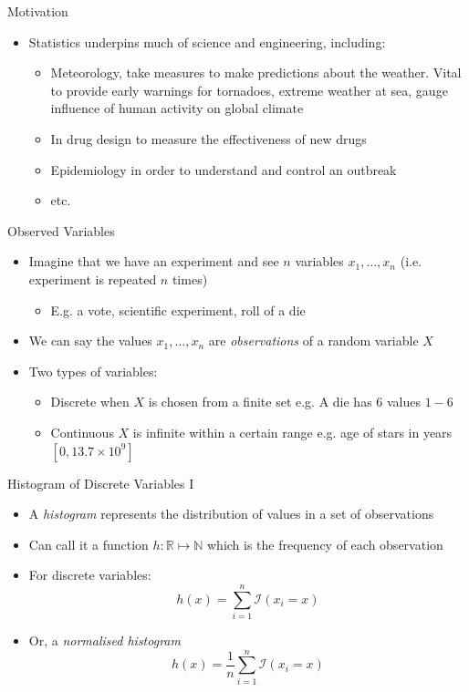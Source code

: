 \documentclass{beamer}
\begin{document}
\begin{frame}{Motivation} 
\begin{itemize} 
 \item Statistics underpins much of science and engineering, including: 
\begin{itemize} 
\item Meteorology, take measures to make predictions about the weather. Vital to provide early warnings for tornadoes, extreme weather at sea, gauge influence of human activity on global climate 
\item In drug design to measure the effectiveness of new drugs 
\item Epidemiology in order to understand and control an outbreak 
\item etc. 
\end{itemize} 
\end{itemize}
\end{frame}

\begin{frame}{Observed Variables}
\begin{itemize} 
 \item Imagine that we have an experiment and see $n$ variables $x_1, \ldots, x_n$ (i.e. experiment is repeated $n$ times)
\begin{itemize} 
\item E.g. a vote, scientific experiment, roll of a die
\end{itemize}
\item We can say the values $x_1, \ldots, x_n$ are \emph{observations} of a random variable $X$ 
\item Two types of variables: 
\begin{itemize} 
 \item Discrete when $X$ is chosen from a finite set e.g. A die has 6 values $1-6$ 
\item Continuous $X$ is infinite within a certain range e.g. age of stars in years $[0, 13.7 \times 10^9]$
\end{itemize}
\end{itemize}
\end{frame}

\begin{frame}{Histogram of Discrete Variables I} 
\begin{itemize} 
 \item A \emph{histogram} represents the distribution of values in a set of observations
\item Can call it a function $h: \mathbb{R} \mapsto \mathbb{N}$ which is the frequency of each observation 
\item For discrete variables:
\begin{displaymath} 
 h(x) = \sum_{i=1}^n \mathcal{I}(x_i = x)
\end{displaymath}
\item Or, a \emph{normalised histogram}
\begin{displaymath} 
  h(x) = \frac{1}{n}\sum_{i=1}^n \mathcal{I}(x_i = x)
\end{displaymath}
\end{itemize}
\end{frame}
\end{document}
